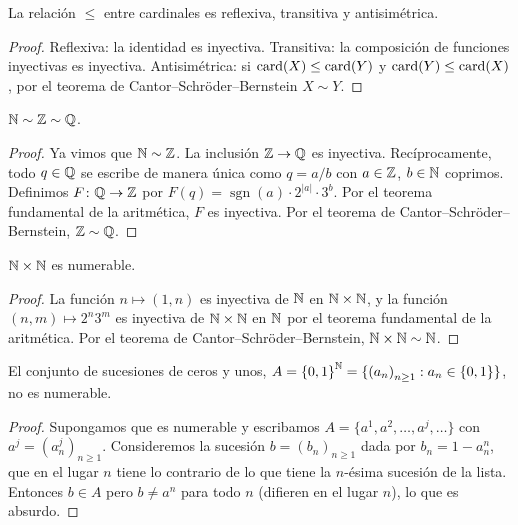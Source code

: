 \begin{prop}
  La relación \(\leq\) entre cardinales es reflexiva, transitiva y antisimétrica.
\end{prop}

\begin{proof}
  Reflexiva: la identidad es inyectiva. Transitiva: la composición de funciones inyectivas es inyectiva. Antisimétrica: si \(\operatorname{card}(X) \leq \operatorname{card}(Y)\) y \(\operatorname{card}(Y) \leq \operatorname{card}(X)\), por el teorema de Cantor--Schröder--Bernstein \(X \sim Y\).
\end{proof}

\begin{eg}
  \(\mathbb{N} \sim \mathbb{Z} \sim \mathbb{Q}\).
\end{eg}

\begin{proof}
  Ya vimos que \(\mathbb{N} \sim \mathbb{Z}\). La inclusión \(\mathbb{Z} \to \mathbb{Q}\) es inyectiva. Recíprocamente, todo \(q \in \mathbb{Q}\) se escribe de manera única como \(q = a/b\) con \(a \in \mathbb{Z}\), \(b \in \mathbb{N}\) coprimos. Definimos \(F\colon \mathbb{Q} \to \mathbb{Z}\) por \(F(q) = \operatorname{sgn}(a) \cdot 2^{|a|} \cdot 3^{b}\). Por el teorema fundamental de la aritmética, \(F\) es inyectiva. Por el teorema de Cantor--Schröder--Bernstein, \(\mathbb{Z} \sim \mathbb{Q}\).
\end{proof}

\begin{eg}
  \(\mathbb{N} \times \mathbb{N}\) es numerable.
\end{eg}

\begin{proof}
  La función \(n \mapsto (1, n)\) es inyectiva de \(\mathbb{N}\) en \(\mathbb{N} \times \mathbb{N}\), y la función \((n, m) \mapsto 2^n 3^m\) es inyectiva de \(\mathbb{N} \times \mathbb{N}\) en \(\mathbb{N}\) por el teorema fundamental de la aritmética. Por el teorema de Cantor--Schröder--Bernstein, \(\mathbb{N} \times \mathbb{N} \sim \mathbb{N}\).
\end{proof}

\begin{eg}
  El conjunto de sucesiones de ceros y unos, \(A = {\{0, 1\}}^{\mathbb{N}} = \{ {(a_n)}_{n \geq 1} : a_n \in \{0, 1\} \}\), no es numerable.
\end{eg}

\begin{proof}
  Supongamos que es numerable y escribamos \(A = \{ a^1, a^2, \dots, a^j, \dots \}\) con \(a^j = {(a^j_n)}_{n \geq 1}\). Consideremos la sucesión \(b = {(b_n)}_{n \geq 1}\) dada por \(b_n = 1 - a^n_n\), que en el lugar \(n\) tiene lo contrario de lo que tiene la \(n\)-ésima sucesión de la lista. Entonces \(b \in A\) pero \(b \neq a^n\) para todo \(n\) (difieren en el lugar \(n\)), lo que es absurdo.
\end{proof}

